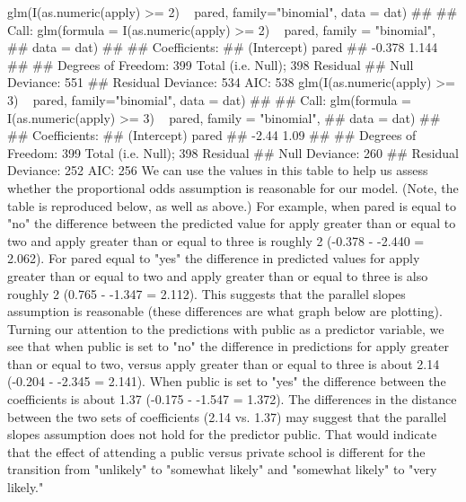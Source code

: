 \documentclass[00-GLMregression.tex]{subfiles}
\begin{document}
glm(I(as.numeric(apply) >= 2) ~ pared, family="binomial", data = dat)
## 
## Call:  glm(formula = I(as.numeric(apply) >= 2) ~ pared, family = "binomial", 
##     data = dat)
## 
## Coefficients:
## (Intercept)        pared  
##      -0.378        1.144  
## 
## Degrees of Freedom: 399 Total (i.e. Null);  398 Residual
## Null Deviance:	    551 
## Residual Deviance: 534 	AIC: 538
glm(I(as.numeric(apply) >= 3) ~ pared, family="binomial", data = dat)
## 
## Call:  glm(formula = I(as.numeric(apply) >= 3) ~ pared, family = "binomial", 
##     data = dat)
## 
## Coefficients:
## (Intercept)        pared  
##       -2.44         1.09  
## 
## Degrees of Freedom: 399 Total (i.e. Null);  398 Residual
## Null Deviance:	    260 
## Residual Deviance: 252 	AIC: 256
We can use the values in this table to help us assess whether the proportional odds assumption is reasonable for our model. (Note, the table is reproduced below, as well as above.) For example, when pared is equal to "no" the difference between the predicted value for apply greater than or equal to two and apply greater than or equal to three is roughly 2 (-0.378 - -2.440 = 2.062). For pared equal to "yes" the difference in predicted values for apply greater than or equal to two and apply greater than or equal to three is also roughly 2 (0.765 - -1.347 = 2.112). This suggests that the parallel slopes assumption is reasonable (these differences are what graph below are plotting). Turning our attention to the predictions with public as a predictor variable, we see that when public is set to "no" the difference in predictions for apply greater than or equal to two, versus apply greater than or equal to three is about 2.14 (-0.204 - -2.345 = 2.141). When public is set to "yes" the difference between the coefficients is about 1.37 (-0.175 - -1.547 = 1.372). The differences in the distance between the two sets of coefficients (2.14 vs. 1.37) may suggest that the parallel slopes assumption does not hold for the predictor public. That would indicate that the effect of attending a public versus private school is different for the transition from "unlikely" to "somewhat likely" and "somewhat likely" to "very likely."
\end{document}
